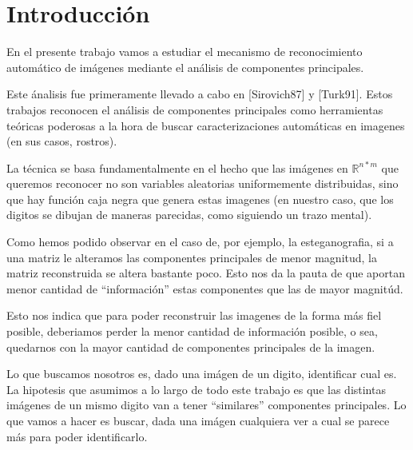 \section{Introducci\'on}

En el presente trabajo vamos a estudiar el mecanismo de reconocimiento autom\'atico de 
im\'agenes mediante el an\'alisis de componentes principales. 

Este \'analisis fue primeramente llevado a cabo en [Sirovich87] y [Turk91]. Estos trabajos
reconocen el an\'alisis de componentes principales como herramientas te\'oricas poderosas
a la hora de buscar caracterizaciones autom\'aticas en imagenes (en  sus casos, rostros).

La t\'ecnica se basa fundamentalmente en el hecho que las im\'agenes en $\mathbb{R}^{n * m}$ que queremos reconocer
no son variables aleatorias uniformemente distribuidas, sino que hay funci\'on caja negra que genera
estas imagenes (en nuestro caso, que los digitos se dibujan de maneras parecidas, como siguiendo un trazo mental).

Como hemos podido observar en el caso de, por ejemplo, la esteganografia, si a una matriz le alteramos las
componentes principales de menor magnitud, la matriz reconstruida se altera bastante poco. Esto nos da
la pauta de que aportan menor cantidad de ``informaci\'on'' estas componentes que las de mayor magnit\'ud.

Esto nos indica que para poder reconstruir las imagenes de la forma m\'as fiel posible,
deberiamos perder la menor cantidad de informaci\'on posible, o sea, quedarnos con la mayor cantidad
de componentes principales de la imagen. 

Lo que buscamos nosotros es, dado una im\'agen de un digito, identificar cual es. La hipotesis
que asumimos a lo largo de todo este trabajo es que las distintas im\'agenes de un mismo digito van 
a tener ``similares'' componentes principales. Lo que vamos a hacer es buscar, dada una im\'agen cualquiera
ver a cual se parece m\'as para poder identificarlo.
